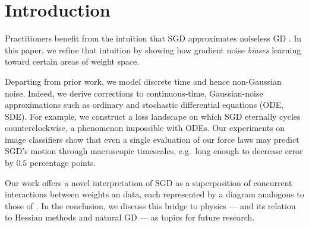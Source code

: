 \documentclass{article}
\theoremstyle{plain}
\theoremstyle{definition}
\begin{document}

\section{Introduction}



    Practitioners benefit from the intuition that SGD approximates noiseless
    GD \cite{bo91}.  In this paper, we refine that intuition by showing
    how gradient noise \emph{biases} learning toward certain areas of weight
    space.
    


    Departing from prior work, we model discrete time and hence non-Gaussian
    noise.  Indeed, we derive corrections to continuous-time, Gaussian-noise
    approximations such as ordinary and stochastic differential equations (ODE,
    SDE).
    For example, we construct a loss landscape on which SGD eternally cycles
    counterclockwise, a phenomenon impossible with ODEs. 
    Our experiments on image classifiers show that even a single evaluation of
    our force laws may predict SGD's motion through macroscopic timescales,
    e.g.\ long enough to decrease error by $0.5$ percentage points.



    Our work offers a novel interpretation of SGD as a superposition of
    concurrent interactions between weights an data, each represented by a
    diagram analogous to those of \citet{fe49, pe71}.
    In the conclusion, we discuss this bridge to physics --- and its relation
    to Hessian methods and natural GD --- as topics for future research.
\end{document}
